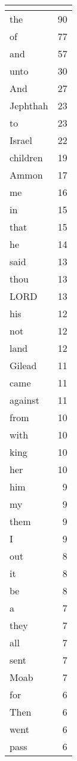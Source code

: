 \begin{center}
\begin{longtable}{l|r}
\hline \multicolumn{2}{c}{{ }} \\ \hline
\endfoot 
the & 90\\ \hline 
of & 77\\ \hline 
and & 57\\ \hline 
unto & 30\\ \hline 
And & 27\\ \hline 
Jephthah & 23\\ \hline 
to & 23\\ \hline 
Israel & 22\\ \hline 
children & 19\\ \hline 
Ammon & 17\\ \hline 
me & 16\\ \hline 
in & 15\\ \hline 
that & 15\\ \hline 
he & 14\\ \hline 
said & 13\\ \hline 
thou & 13\\ \hline 
LORD & 13\\ \hline 
his & 12\\ \hline 
not & 12\\ \hline 
land & 12\\ \hline 
Gilead & 11\\ \hline 
came & 11\\ \hline 
against & 11\\ \hline 
from & 10\\ \hline 
with & 10\\ \hline 
king & 10\\ \hline 
her & 10\\ \hline 
him & 9\\ \hline 
my & 9\\ \hline 
them & 9\\ \hline 
I & 9\\ \hline 
out & 8\\ \hline 
it & 8\\ \hline 
be & 8\\ \hline 
a & 7\\ \hline 
they & 7\\ \hline 
all & 7\\ \hline 
sent & 7\\ \hline 
Moab & 7\\ \hline 
for & 6\\ \hline 
Then & 6\\ \hline 
went & 6\\ \hline 
pass & 6\\ \hline 

\end{longtable}
\end{center}
